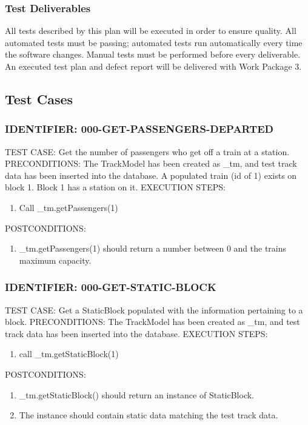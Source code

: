 \documentclass{scrreprt}
\begin{document}
\subsubsection{Test Deliverables}
All tests described by this plan will be executed in order to ensure quality. All automated tests must be passing; automated tests run automatically every time the software changes. Manual tests must be performed before every deliverable. An executed test plan and defect report will be delivered with Work Package 3.

\subsection{Test Cases}

\subsubsection{IDENTIFIER: 000-GET-PASSENGERS-DEPARTED}
TEST CASE: Get the number of passengers who get off a train at a station.
PRECONDITIONS: The TrackModel has been created as _tm, and test track data has been inserted into the database. A populated train (id of 1) exists on block 1. Block 1 has a station on it.
EXECUTION STEPS:
\begin{enumerate}
	\item Call _tm.getPassengers(1)
\end{enumerate}
POSTCONDITIONS:
\begin{enumerate}
	\item _tm.getPassengers(1) should return a number between 0 and the trains maximum capacity.
\end{enumerate}

\subsubsection{IDENTIFIER: 000-GET-STATIC-BLOCK}
TEST CASE: Get a StaticBlock populated with the information pertaining to a block.
PRECONDITIONS: The TrackModel has been created as _tm, and test track data has been inserted into the database.
EXECUTION STEPS:
\begin{enumerate}
	\item call _tm.getStaticBlock(1)
\end{enumerate}
POSTCONDITIONS:
\begin{enumerate}
	\item _tm.getStaticBlock() should return an instance of StaticBlock.
	\item The instance should contain static data matching the test track data.
\end{enumerate}
\end{document}
